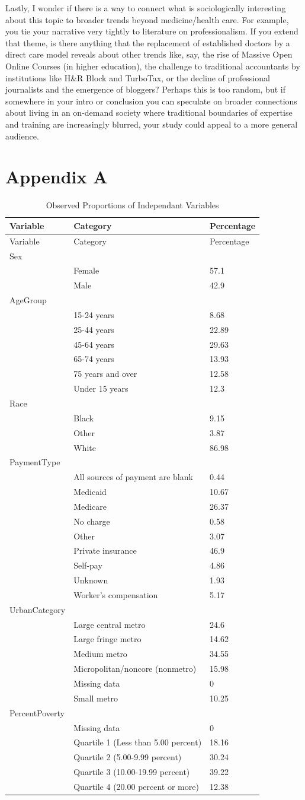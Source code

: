 \documentclass[12pt,twoside]{reedthesis}
\begin{document}
  Lastly, I wonder if there is a way to connect what is sociologically
  interesting about this topic to broader trends beyond medicine/health
  care. For example, you tie your narrative very tightly to literature on
  professionalism. If you extend that theme, is there anything that the
  replacement of established doctors by a direct care model reveals about
  other trends like, say, the rise of Massive Open Online Courses (in
  higher education), the challenge to traditional accountants by
  institutions like H\&R Block and TurboTax, or the decline of
  professional journalists and the emergence of bloggers? Perhaps this is
  too random, but if somewhere in your intro or conclusion you can
  speculate on broader connections about living in an on-demand society
  where traditional boundaries of expertise and training are increasingly
  blurred, your study could appeal to a more general audience.
  
  \chapter*{Appendix A}\label{appendix-a}
  
  \setcounter{chapter}{7} \setcounter{section}{0} \newpage
    \doublespacing
  
  \singlespacing
  
  \begin{longtable}[c]{@{}lll@{}}
  \caption{Observed Proportions of Independant Variables
  \label{tab:sums}}\tabularnewline
  \toprule
  Variable & Category & Percentage\tabularnewline
  \midrule
  \endfirsthead
  \toprule
  Variable & Category & Percentage\tabularnewline
  \midrule
  \endhead
  Sex & &\tabularnewline
  & Female & 57.1\tabularnewline
  & Male & 42.9\tabularnewline
  AgeGroup & &\tabularnewline
  & 15-24 years & 8.68\tabularnewline
  & 25-44 years & 22.89\tabularnewline
  & 45-64 years & 29.63\tabularnewline
  & 65-74 years & 13.93\tabularnewline
  & 75 years and over & 12.58\tabularnewline
  & Under 15 years & 12.3\tabularnewline
  Race & &\tabularnewline
  & Black & 9.15\tabularnewline
  & Other & 3.87\tabularnewline
  & White & 86.98\tabularnewline
  PaymentType & &\tabularnewline
  & All sources of payment are blank & 0.44\tabularnewline
  & Medicaid & 10.67\tabularnewline
  & Medicare & 26.37\tabularnewline
  & No charge & 0.58\tabularnewline
  & Other & 3.07\tabularnewline
  & Private insurance & 46.9\tabularnewline
  & Self-pay & 4.86\tabularnewline
  & Unknown & 1.93\tabularnewline
  & Worker's compensation & 5.17\tabularnewline
  UrbanCategory & &\tabularnewline
  & Large central metro & 24.6\tabularnewline
  & Large fringe metro & 14.62\tabularnewline
  & Medium metro & 34.55\tabularnewline
  & Micropolitan/noncore (nonmetro) & 15.98\tabularnewline
  & Missing data & 0\tabularnewline
  & Small metro & 10.25\tabularnewline
  PercentPoverty & &\tabularnewline
  & Missing data & 0\tabularnewline
  & Quartile 1 (Less than 5.00 percent) & 18.16\tabularnewline
  & Quartile 2 (5.00-9.99 percent) & 30.24\tabularnewline
  & Quartile 3 (10.00-19.99 percent) & 39.22\tabularnewline
  & Quartile 4 (20.00 percent or more) & 12.38\tabularnewline
  \bottomrule
  \end{longtable}
  
\end{document}
